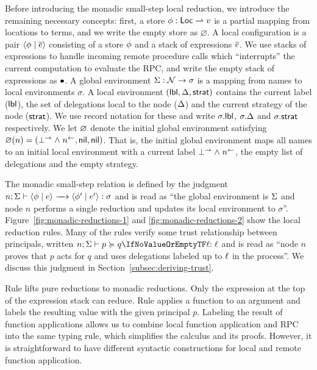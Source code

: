 Before introducing the monadic small-step local reduction, we introduce the remaining necessary concepts: first, a store $\phi: \mathsf{Loc} \rightharpoonup v$ is a partial mapping from locations to terms, and we write the empty store as $\varnothing$. A local configuration is a pair $\langle \phi \mid \overline{e} \rangle$ consisting of a store $\phi$ and a stack of expressions $\overline{e}$. We use stacks of expressions to handle incoming remote procedure calls which ``interrupts'' the current computation to evaluate the RPC, and write the empty stack of expressions as $\bullet$. A global environment $\Sigma: \mathcal{N} \to \sigma$ is a mapping from names to local environments $\sigma$. A local environment $(\mathsf{lbl}, \Delta, \mathsf{strat})$ contains the current label ($\mathsf{lbl}$), the set of delegations local to the node ($\Delta$) and the current strategy of the node ($\mathsf{strat}$). We use record notation for these and write $\sigma.\mathsf{lbl}$, $\sigma.\Delta$ and $\sigma.\mathsf{strat}$ respectively. We let $\varnothing$ denote the initial global environment satisfying $\varnothing(n) = (\bot^{\rightarrow} \mathrel{\land} n^{\leftarrow}, \mathsf{nil}, \mathsf{nil})$. That is, the initial global environment maps all names to an initial local environment with a current label $\bot^{\rightarrow} \mathrel{\land} n^{\leftarrow}$, the empty list of delegations and the empty strategy.

The monadic small-step relation is defined by the judgment $\step{n; \env}{\config{\store}{\expr}}{\config{\store'}{\expr'}}{\sigma}$ and is read as ``the global environment is $\Sigma$ and node $n$ performs a single reduction and updates its local environment to $\sigma$''. Figure~\ref{fig:monadic-reductions-1} and \ref{fig:monadic-reductions-2} show the local reduction rules. Many of the rules verify some trust relationship between principals, written $\actsforquery{n; \env}{p}{q}{\level}$ and is read as ``node $n$ proves that $p$ acts for $q$ and uses delegations labeled up to $\ell$ in the process''. We discuss this judgment in Section~\ref{subsec:deriving-trust}.

Rule  lifts pure reductions to monadic reductions. Only the expression at the top of the expression stack can reduce. Rule  applies a function to an argument and labels the resulting value with the given principal $p$. Labeling the result of function applications allows us to combine local function application and RPC into the same typing rule, which simplifies the calculus and its proofs. However, it is straightforward to have different syntactic constructions for local and remote function application.

